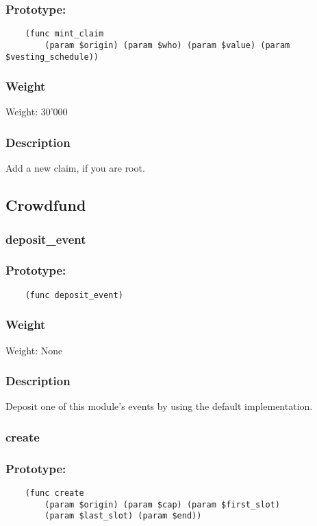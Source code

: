 \documentclass[11pt,a4paper]{article}
\begin{document}
\subsubsection*{Prototype:}
\begin{verbatim}
    (func mint_claim
        (param $origin) (param $who) (param $value) (param $vesting_schedule))
\end{verbatim}
\subsubsection*{Weight}
Weight: 30'000
\subsubsection*{Description}
Add a new claim, if you are root.

\subsection{Crowdfund}
\subsubsection{deposit\_event}
\subsubsection*{Prototype:}
\begin{verbatim}
    (func deposit_event)
\end{verbatim}
\subsubsection*{Weight}
Weight: None
\subsubsection*{Description}
Deposit one of this module's events by using the default implementation.

\subsubsection{create}
\subsubsection*{Prototype:}
\begin{verbatim}
    (func create 
        (param $origin) (param $cap) (param $first_slot)
        (param $last_slot) (param $end))
\end{verbatim}
\end{document}
